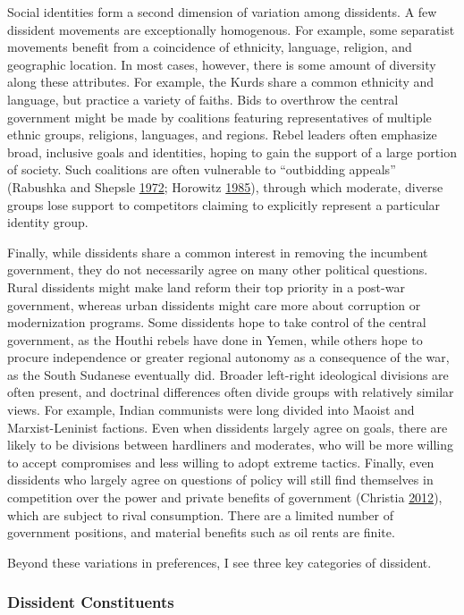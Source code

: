 \documentclass[12pt,]{book}
\theoremstyle{definition}
\theoremstyle{definition}
\theoremstyle{definition}
\theoremstyle{remark}
\begin{document}
Social identities form a second dimension of variation among dissidents.
A few dissident movements are exceptionally homogenous. For example,
some separatist movements benefit from a coincidence of ethnicity,
language, religion, and geographic location. In most cases, however,
there is some amount of diversity along these attributes. For example,
the Kurds share a common ethnicity and language, but practice a variety
of faiths. Bids to overthrow the central government might be made by
coalitions featuring representatives of multiple ethnic groups,
religions, languages, and regions. Rebel leaders often emphasize broad,
inclusive goals and identities, hoping to gain the support of a large
portion of society. Such coalitions are often vulnerable to ``outbidding
appeals'' (Rabushka and Shepsle
\protect\hyperlink{ref-Rabushka1972}{1972}; Horowitz
\protect\hyperlink{ref-horowitz85}{1985}), through which moderate,
diverse groups lose support to competitors claiming to explicitly
represent a particular identity group.

Finally, while dissidents share a common interest in removing the
incumbent government, they do not necessarily agree on many other
political questions. Rural dissidents might make land reform their top
priority in a post-war government, whereas urban dissidents might care
more about corruption or modernization programs. Some dissidents hope to
take control of the central government, as the Houthi rebels have done
in Yemen, while others hope to procure independence or greater regional
autonomy as a consequence of the war, as the South Sudanese eventually
did. Broader left-right ideological divisions are often present, and
doctrinal differences often divide groups with relatively similar views.
For example, Indian communists were long divided into Maoist and
Marxist-Leninist factions. Even when dissidents largely agree on goals,
there are likely to be divisions between hardliners and moderates, who
will be more willing to accept compromises and less willing to adopt
extreme tactics. Finally, even dissidents who largely agree on questions
of policy will still find themselves in competition over the power and
private benefits of government (Christia
\protect\hyperlink{ref-Christia2012}{2012}), which are subject to rival
consumption. There are a limited number of government positions, and
material benefits such as oil rents are finite.

Beyond these variations in preferences, I see three key categories of
dissident.

\hypertarget{dissident-constituents}{%
\subsubsection*{Dissident Constituents}\label{dissident-constituents}}
\end{document}
